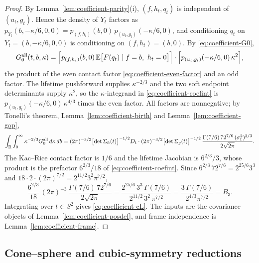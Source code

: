 \begin{proof}
By Lemma~\ref{lem:coefficient-parity}(i), $(f,h_t,q_t)$ is independent of $(u_t,g_t)$. Hence the density of $Y_t$ factors as $p_{Y_t}(b,-\kappa/6,0,0)=p_{(f,h_t)}(b,0)\,p_{(u_t,g_t)}(-\kappa/6,0)$, and conditioning $q_t$ on $Y_t=(b,-\kappa/6,0,0)$ is conditioning on $(f,h_t)=(b,0)$. By \eqref{eq:coefficient-G0},
\[
G^{\rm all}_0(t,b,\kappa)=\Bigl[p_{(f,h_t)}(b,0)\,\E\bigl[F(q_t)\mid f=b,\ h_t=0\bigr]\Bigr]\cdot\Bigl[p_{(u_t,g_t)}(-\kappa/6,0)\,\kappa^2\Bigr],
\]
the product of the even contact factor \eqref{eq:coefficient-even-factor} and an odd factor. The lifetime pushforward supplies $\kappa^{-2/3}$ and the two soft endpoint determinants supply $\kappa^2$, so the $\kappa$-integrand in \eqref{eq:coefficient-coefint} is $p_{(u_t,g_t)}(-\kappa/6,0)\,\kappa^{4/3}$ times the even factor. All factors are nonnegative; by Tonelli's theorem, Lemma~\ref{lem:coefficient-birth} and Lemma~\ref{lem:coefficient-gap},
\[
\int_{\mathbb R}\int_0^\infty\kappa^{-2/3}G^{\rm all}_0\,d\kappa\,db
=(2\pi)^{-3/2}\bigl[\det\Sigma_h(t)\bigr]^{-1/2}D_t\cdot(2\pi)^{-3/2}\bigl[\det\Sigma_g(t)\bigr]^{-1/2}\,\frac{\Gamma(7/6)\,72^{7/6}\,(\sigma_t^2)^{2/3}}{2\sqrt{2\pi}} .
\]
The Kac--Rice contact factor is $1/6$ and the lifetime Jacobian is $6^{2/3}/3$, whose product is the prefactor $6^{2/3}/18$ of \eqref{eq:coefficient-coefint}. Since $6^{2/3}\,72^{7/6}=2^{25/6}3^3$ and $18\cdot2\cdot(2\pi)^{7/2}=2^{11/2}3^2\pi^{7/2}$,
\[
\frac{6^{2/3}}{18}\,(2\pi)^{-3}\,\frac{\Gamma(7/6)\,72^{7/6}}{2\sqrt{2\pi}}=\frac{2^{25/6}\,3^3\,\Gamma(7/6)}{2^{11/2}\,3^2\,\pi^{7/2}}=\frac{3\,\Gamma(7/6)}{2^{4/3}\pi^{7/2}}=B_3 .
\]
Integrating over $t\in S^2$ gives \eqref{eq:coefficient-cL}. The inputs are the covariance objects of Lemma~\ref{lem:coefficient-posdef}, and frame independence is Lemma~\ref{lem:coefficient-frame}.
\end{proof}

\subsection{Cone--sphere and cubic-symmetry reductions}\label{ssec:coefficient-reductions}

